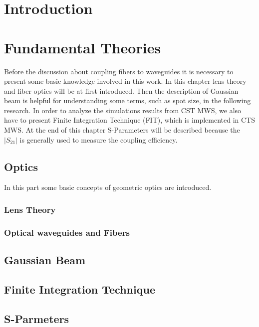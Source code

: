 
\chapter{Introduction}



\chapter{Fundamental Theories}
\label{chp:background}
Before the discussion about coupling fibers to waveguides it is necessary to present some basic knowledge involved in this work.  In this chapter lens theory and fiber optics will be at first introduced. Then the description of Gaussian beam is helpful for understanding some terms, such as spot size, in the following research.  
In order to analyze the simulations results from CST MWS, we also have to present Finite Integration Technique (FIT), which is implemented in CTS MWS. At the end of this chapter S-Parameters will be described because the $|S_{21}|$ is generally used to measure the coupling efficiency.
 
\section{Optics}
\label{sect:background_optics}
In this part some basic concepts of geometric optics are introduced.
\subsection{Lens Theory}

\subsection{Optical waveguides and Fibers}


\section{Gaussian Beam}
\label{sect:gaussian_beam}


\section{Finite Integration Technique}
\label{sect:FIT}



\section{S-Parmeters}


